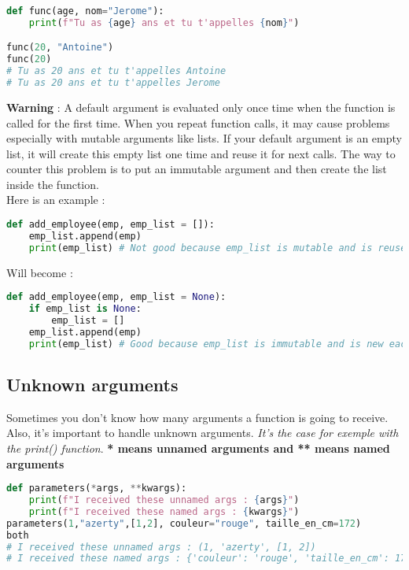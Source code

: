 \documentclass[a4paper, 12pt, titlepage]{scrartcl} %
\begin{document}
\begin{lstlisting}[language=Python]
def func(age, nom="Jerome"):
	print(f"Tu as {age} ans et tu t'appelles {nom}")

func(20, "Antoine")
func(20)
# Tu as 20 ans et tu t'appelles Antoine
# Tu as 20 ans et tu t'appelles Jerome
\end{lstlisting} \vspace{5mm}

\textbf{Warning} : A default argument is evaluated only once time when the function is called for the first time. When you repeat function calls, it may cause problems especially with mutable arguments like lists. If your default argument is an empty list, it will create this empty list one time and reuse it for next calls. The way to counter this problem is to put an immutable argument and then create the list inside the function. \\
Here is an example : 
\begin{lstlisting}[language=Python]
def add_employee(emp, emp_list = []):
    emp_list.append(emp)
    print(emp_list) # Not good because emp_list is mutable and is reused each time this function is called.
\end{lstlisting} \vspace{5mm}
Will become :
\begin{lstlisting}[language=Python]
def add_employee(emp, emp_list = None):
    if emp_list is None:
        emp_list = []
    emp_list.append(emp)
    print(emp_list) # Good because emp_list is immutable and is new each time this function is called.
\end{lstlisting} \vspace{5mm}

\subsection{Unknown arguments}
Sometimes you don't know how many arguments a function is going to receive. Also, it's important to handle unknown arguments. \textit{It's the case for exemple with the print() function}. \textbf{* means unnamed arguments and ** means named arguments}
\begin{lstlisting}[language=Python]
def parameters(*args, **kwargs):
	print(f"I received these unnamed args : {args}")
	print(f"I received these named args : {kwargs}")
parameters(1,"azerty",[1,2], couleur="rouge", taille_en_cm=172)
both
# I received these unnamed args : (1, 'azerty', [1, 2])
# I received these named args : {'couleur': 'rouge', 'taille_en_cm': 172}
\end{lstlisting} \vspace{5mm}
\end{document}
